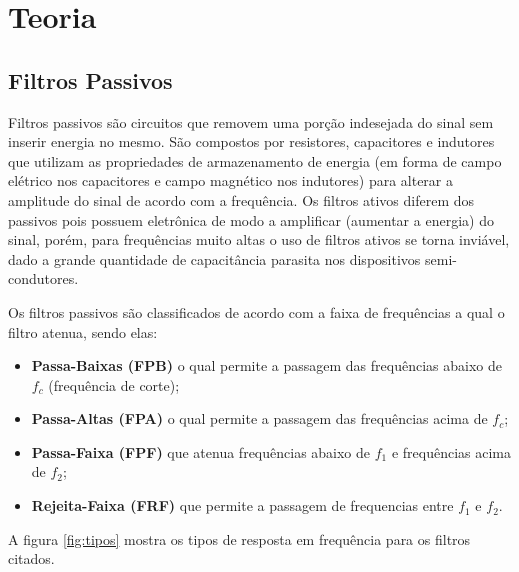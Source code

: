 
\newpage

\section{Teoria}
\subsection{Filtros Passivos}
Filtros passivos são circuitos que removem uma porção indesejada do sinal sem inserir energia no mesmo. São compostos por resistores, capacitores e indutores que utilizam as propriedades de armazenamento de energia (em forma de campo elétrico nos capacitores e campo magnético nos indutores) para alterar a amplitude do sinal de acordo com a frequência. Os filtros ativos diferem dos passivos pois possuem eletrônica de modo a amplificar (aumentar a energia) do sinal, porém, para frequências muito altas o uso de filtros ativos se torna inviável, dado a grande quantidade de capacitância parasita nos dispositivos semi-condutores.

Os filtros passivos são classificados de acordo com a faixa de frequências a qual o filtro atenua, sendo elas:
\begin{itemize}
    \item \textbf{Passa-Baixas (FPB)} o qual permite a passagem das frequências abaixo de $f_c$ (frequência de corte);
    
    \item \textbf{Passa-Altas (FPA)} o qual permite a passagem das frequências acima de $f_c$;
    
    \item \textbf{Passa-Faixa (FPF)} que atenua frequências abaixo de $f_1$ e frequências acima de $f_2$;
    
    \item \textbf{Rejeita-Faixa (FRF)} que permite a passagem de frequencias entre $f_1$ e $f_2$.
    
\end{itemize}

A figura \ref{fig:tipos} mostra os tipos de resposta em frequência para os 
filtros citados.

